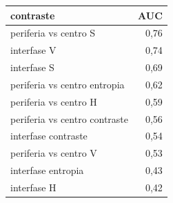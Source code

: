 \begin{tabular}{lr}
\toprule
contraste & AUC \\
\midrule
periferia vs centro S & 0{,}76 \\
interfase V & 0{,}74 \\
interfase S & 0{,}69 \\
periferia vs centro entropia & 0{,}62 \\
periferia vs centro H & 0{,}59 \\
periferia vs centro contraste & 0{,}56 \\
interfase contraste & 0{,}54 \\
periferia vs centro V & 0{,}53 \\
interfase entropia & 0{,}43 \\
interfase H & 0{,}42 \\
\bottomrule
\end{tabular}

